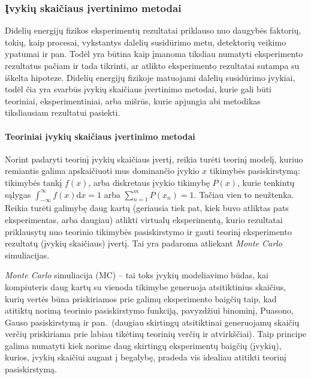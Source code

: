 \documentclass[a4paper, 12pt]{article}
\begin{document}
\subsubsection{Įvykių skaičiaus įvertinimo metodai}

Didelių energijų fizikos eksperimentų rezultatai priklauso nuo daugybės faktorių, tokių, kaip procesai, vykstantys dalelių susidūrimo metu, detektorių veikimo ypatumai ir pan. Todėl yra būtina kaip įmanoma tiksliau numatyti eksperimento rezultatus pačiam ir tada tikrinti, ar atlikto eksperimento rezultatai sutampa su iškelta hipoteze. Didelių energijų fizikoje matuojami dalelių susidūrimo įvykiai, todėl čia yra svarbūs įvykių skaičiaus įvertinimo metodai, kurie gali būti teoriniai, eksperimentiniai, arba mišrūs, kurie apjungia abi metodikas tiksliausiam rezultatui pasiekti.

\paragraph{Teoriniai įvykių skaičiaus įvertinimo metodai\\}

Norint padaryti teorinį įvykių skaičiaus įvertį, reikia turėti teorinį modelį, kuriuo remiantis galima apskaičiuoti mus dominančio įvykio $x$ tikimybės pasiskirstymą: tikimybės tankį $f(x)$, arba diskretaus įvykio tikimybę $P(x)$, kurie tenkintų sąlygas $\int_{-\infty}^{\infty}f(x)\mathrm{d}x=1$ arba $\sum_{n=1}^{m}P(x_{n})=1$. Tačiau vien to neužtenka. Reikia turėti galimybę daug kartų (geriausia tiek pat, kiek buvo atliktas pats eksperimentas, arba daugiau) atlikti virtualų eksperimentą, kurio rezultatai priklausytų nuo teorinio tikimybės pasiskirstymo ir gauti teorinį eksperimento rezultatų (įvykių skaičiaus) įvertį. Tai yra padaroma atliekant \textit{Monte Carlo} simuliacijas.

\textit{Monte Carlo} simuliacija (MC) -- tai toks įvykių modeliavimo būdas, kai kompiuteris daug kartų su vienoda tikimybe generuoja atsitiktinius skaičius, kurių vertės būna priskiriamos prie galimų eksperimento baigčių taip, kad atitiktų norimą teorinio pasiskirstymo funkciją, pavyzdžiui binominį, Puasono, Gauso pasiskirstymą ir pan.\ (daugiau skirtingų atsitiktinai generuojamų skaičių verčių priskiriama prie labiau tikėtinų teorinių verčių ir atvirkščiai). Taip principe galima numatyti kiek norime daug skirtingų eksperimentų baigčių (įvykių), kurios, įvykių skaičiui augant į begalybę, pradeda vis idealiau atitikti teorinį pasiskirstymą.
\end{document}
